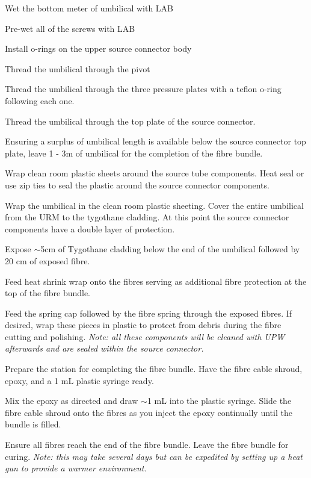 \documentclass[11pt]{article}
\begin{document}
\begin{answerlist}
\item Wet the bottom meter of umbilical with LAB
\item Pre-wet all of the screws with LAB
\item Install o-rings on the upper source connector body 
\item Thread the umbilical through the pivot
\item Thread the umbilical through the three pressure plates with a teflon o-ring following each one.
\item Thread the umbilical through the top plate of the source connector.
\item Ensuring a surplus of umbilical length is available below the source connector top plate, leave 1 - 3m of umbilical for the completion of the fibre bundle.
\item Wrap clean room plastic sheets around the source tube components. Heat seal or use zip ties to seal the plastic around the source connector components.
\item Wrap the umbilical in the clean room plastic sheeting. Cover the entire umbilical from the URM to the tygothane cladding. At this point the source connector components have a double layer of protection.
\item Expose $\sim$5cm of Tygothane cladding below the end of the umbilical followed by 20 cm of exposed fibre.
\item Feed heat shrink wrap onto the fibres serving as additional fibre protection at the top of the fibre bundle.
\item Feed the spring cap followed by the fibre spring through the exposed fibres. If desired, wrap these pieces in plastic to protect from debris during the fibre cutting and polishing. \textit{Note: all these components will be cleaned with UPW afterwards and are sealed within the source connector.}
\item Prepare the station for completing the fibre bundle. Have the fibre cable shroud, epoxy, and a 1 mL plastic syringe ready.
\item Mix the epoxy as directed and draw $\sim$1 mL into the plastic syringe. Slide the fibre cable shroud onto the fibres as you inject the epoxy continually until the bundle is filled.
\item Ensure all fibres reach the end of the fibre bundle. Leave the fibre bundle for curing. \textit{Note: this may take several days but can be expedited by setting up a heat gun to provide a warmer environment.}

\end{answerlist}
\end{document}
